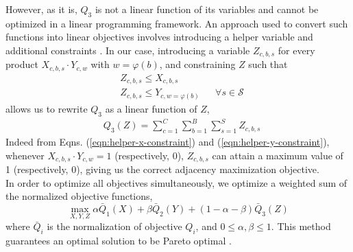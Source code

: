 However, as it is, $Q_3$ is not a linear function of its variables and cannot be optimized in a linear programming framework. An approach used to convert such functions into linear objectives involves introducing a helper variable and additional constraints \cite{hammer_boolean_1968}. In our case, introducing a variable $Z_{c, b, s}$ for every product $X_{c, b, s} \cdot Y_{c, w}$ with $w = \varphi(b)$, and constraining $Z$ such that 
\begin{align}
	&Z_{c, b, s} \leq X_{c, b, s} \label{eqn:helper-x-constraint}\\
	&Z_{c, b, s} \leq Y_{c, w=\varphi(b)} &&\forall s\in\mathcal{S} \label{eqn:helper-y-constraint}
\end{align}
allows us to rewrite $Q_3$ as a linear function of $Z$,
\begin{align}
	&Q_3(Z) = \sum_{c=1}^{C} \sum_{b=1}^{B} \sum_{s=1}^{S} Z_{c, b, s}
\end{align}
Indeed from Eqns. (\ref{eqn:helper-x-constraint}) and (\ref{eqn:helper-y-constraint}),  whenever $X_{c, b, s} \cdot Y_{c, w} = 1$ (respectively, 0), $Z_{c, b, s}$ can attain a maximum value of 1 (respectively, 0), giving us the correct adjacency maximization objective. \\

In order to optimize all objectives simultaneously, we optimize a weighted sum of the normalized objective functions,
\begin{equation}
\max_{X, Y, Z} \alpha \bar{Q}_1(X) + \beta \bar{Q}_2(Y) + (1 - \alpha - \beta) \bar{Q}_3(Z)
\end{equation}
where $\bar{Q}_i$ is the normalization of objective $Q_i$, and $0 \leq \alpha, \beta \leq 1$. This method guarantees an optimal solution to be Pareto optimal \cite{stanimirovic_linear_2011}. \\

